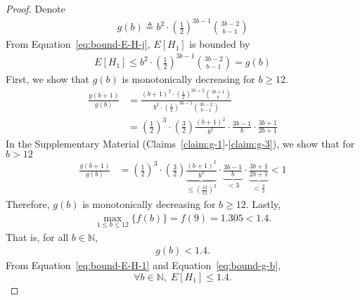 \begin{proof}
Denote 
\begin{align}
    g(b) \triangleq b^2 \cdot \left(\frac{1}{2}\right)^{3b -1} {{3b-2} \choose b-1}
\end{align}
From Equation~\ref{eq:bound-E-H-j}, $E[H_1]$ is bounded by 
\begin{align}
    E[H_1] \leq b^2 \cdot \left(\frac{1}{2}\right)^{3b -1} {{3b-2} \choose b-1} = g(b)
    \label{eq:bound-E-H-1}
\end{align}
First, we show that $g(b)$ is monotonically decreasing for $b \geq 12$.
\begin{align}
    \frac{g(b+1)}{g(b)} &= \frac{(b+1)^2 \cdot \left(\frac{1}{2}\right)^{3b +2} {{3b+1} \choose b}}{b^2 \cdot \left(\frac{1}{2}\right)^{3b -1} {{3b-2} \choose b-1}} \\
    &= \left(\frac{1}{2}\right)^3 \cdot \left(\frac{3}{2}\right) \frac{(b+1)^2}{b^2} \cdot \frac{3b-1}{b} \cdot \frac{3b+1}{2b+1}
\end{align}
 In the Supplementary Material (Claims~\ref{claim:g-1}-\ref{claim:g-3}), we show that for $b>12$
\begin{align}
     \frac{g(b+1)}{g(b)} &= \left(\frac{1}{2}\right)^3 \cdot \left(\frac{3}{2}\right) \underbrace{\frac{(b+1)^2}{b^2}}_{\leq \left(\frac{13}{12}\right)^2} \cdot \underbrace{\frac{3b-1}{b}}_{<3} \cdot \underbrace{\frac{3b+1}{2b+1}}_{<\frac{3}{2}} < 1
 \end{align}
Therefore, $g(b)$ is monotonically decreasing for $b \geq 12$.
Lastly,
\begin{align}
    \max_{1\leq b \leq 12}\{f(b)\} = f(9)=1.305 < 1.4.
\end{align}
That is, for all $b \in \mathds{N}$,
\begin{align}
    g(b) < 1.4.
    \label{eq:bound-g-b}
\end{align}
From Equation~\ref{eq:bound-E-H-1} and Equation~\ref{eq:bound-g-b},
\[\forall b\in \mathds{N}, \; E[H_{1}] \leq 1.4.\] 
\end{proof}

